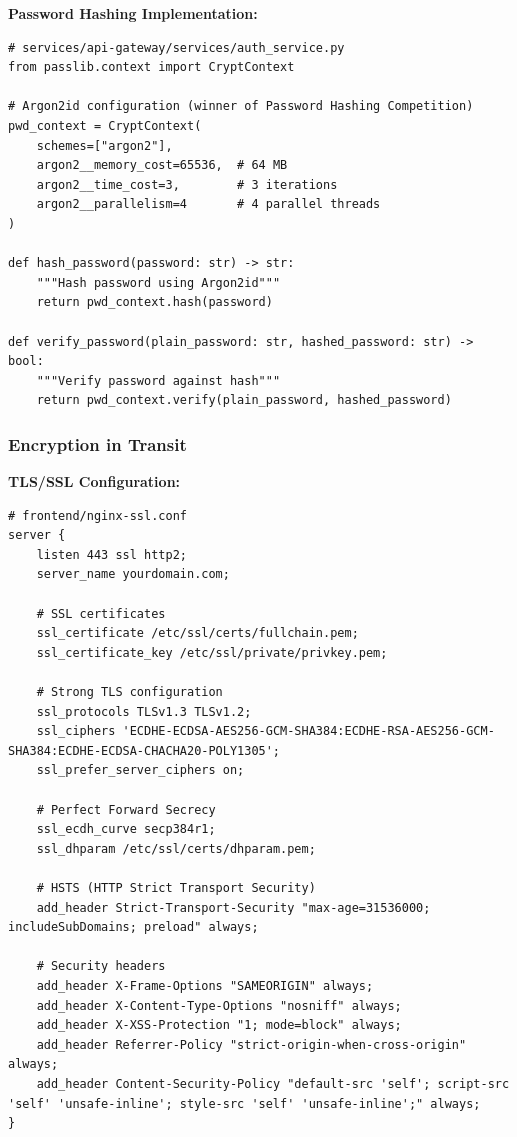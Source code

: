 \textbf{Password Hashing Implementation:}
\begin{lstlisting}[style=pythonstyle]
# services/api-gateway/services/auth_service.py
from passlib.context import CryptContext

# Argon2id configuration (winner of Password Hashing Competition)
pwd_context = CryptContext(
    schemes=["argon2"],
    argon2__memory_cost=65536,  # 64 MB
    argon2__time_cost=3,        # 3 iterations
    argon2__parallelism=4       # 4 parallel threads
)

def hash_password(password: str) -> str:
    """Hash password using Argon2id"""
    return pwd_context.hash(password)

def verify_password(plain_password: str, hashed_password: str) -> bool:
    """Verify password against hash"""
    return pwd_context.verify(plain_password, hashed_password)
\end{lstlisting}

\subsubsection{Encryption in Transit}

\textbf{TLS/SSL Configuration:}
\begin{lstlisting}[style=pythonstyle]
# frontend/nginx-ssl.conf
server {
    listen 443 ssl http2;
    server_name yourdomain.com;
    
    # SSL certificates
    ssl_certificate /etc/ssl/certs/fullchain.pem;
    ssl_certificate_key /etc/ssl/private/privkey.pem;
    
    # Strong TLS configuration
    ssl_protocols TLSv1.3 TLSv1.2;
    ssl_ciphers 'ECDHE-ECDSA-AES256-GCM-SHA384:ECDHE-RSA-AES256-GCM-SHA384:ECDHE-ECDSA-CHACHA20-POLY1305';
    ssl_prefer_server_ciphers on;
    
    # Perfect Forward Secrecy
    ssl_ecdh_curve secp384r1;
    ssl_dhparam /etc/ssl/certs/dhparam.pem;
    
    # HSTS (HTTP Strict Transport Security)
    add_header Strict-Transport-Security "max-age=31536000; includeSubDomains; preload" always;
    
    # Security headers
    add_header X-Frame-Options "SAMEORIGIN" always;
    add_header X-Content-Type-Options "nosniff" always;
    add_header X-XSS-Protection "1; mode=block" always;
    add_header Referrer-Policy "strict-origin-when-cross-origin" always;
    add_header Content-Security-Policy "default-src 'self'; script-src 'self' 'unsafe-inline'; style-src 'self' 'unsafe-inline';" always;
}
\end{lstlisting}

